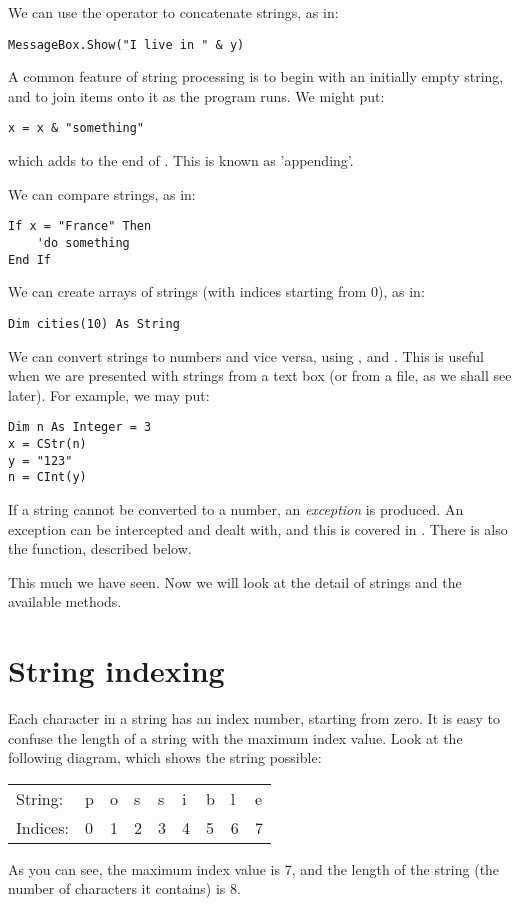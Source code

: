 		We can use the \keyword{\&} operator to concatenate strings, as in:
		\begin{lstlisting}
MessageBox.Show("I live in " & y)
		\end{lstlisting}
		A common feature of string processing is to begin with an initially empty string, and to join items onto it as the program runs. We might put:
		\begin{lstlisting}
x = x & "something"
		\end{lstlisting}
		which adds to the end of . This is known as 'appending'.

		We can compare strings, as in:
		\begin{lstlisting}
If x = "France" Then
	'do something
End If
		\end{lstlisting}
		We can create arrays of strings (with indices starting from 0), as in:
		\begin{lstlisting}
Dim cities(10) As String
		\end{lstlisting}
		We can convert strings to numbers and vice versa, using ,  and . This is useful when we are presented with strings from a text box (or from a file, as we shall see later). For example, we may put:
		\begin{lstlisting}
Dim n As Integer = 3
x = CStr(n)
y = "123"
n = CInt(y)
		\end{lstlisting}
		If a string cannot be converted to a number, an \emph{exception} is produced. An exception can be intercepted and dealt with, and this is covered in . There is also the  function, described below.
		
		This much we have seen. Now we will look at the detail of strings and the available methods.


	\section{String indexing}
		Each character in a string has an index number, starting from zero. It is easy to confuse the length of a string with the maximum index value. Look at the following diagram, which shows the string possible:
		\begin{center}
			\begin{tabular}{l |l|l|l|l|l|l|l|l|}
				\cline{2-9}
			String: &	p	& o & s & s & i & b & l & e\\ \cline{2-9}
			\multicolumn{1}{l}{Indices:} &	\multicolumn{1}{l}{0} &	\multicolumn{1}{l}{1} &	\multicolumn{1}{l}{2}  &	\multicolumn{1}{l}{3} &	\multicolumn{1}{l}{4} &	\multicolumn{1}{l}{5} &	\multicolumn{1}{l}{6} &	\multicolumn{1}{l}{7} \\
			\end{tabular}
		\end{center}
		As you can see, the maximum index value is 7, and the length of the string (the number of characters it contains) is 8.


